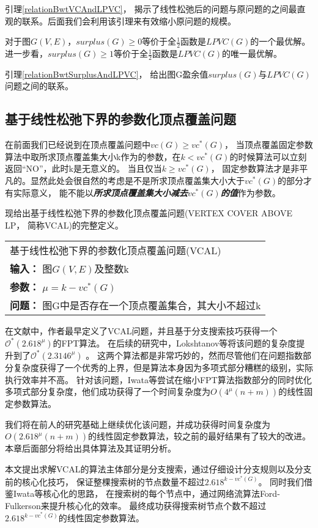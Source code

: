 引理\ref{relationBwtVCAndLPVC}， 揭示了线性松弛后的问题与原问题的之间最直观的联系。后面我们会利用该引理来有效缩小原问题的规模。

\begin{lemma}\label{relationBwtSurplusAndLPVC}
对于图$G(V, E)$，$surplus(G) \ge 0$等价于全$\frac{1}{2}$函数是$LPVC(G)$的一个最优解。
进一步看，$surplus(G) \ge 1$等价于全$\frac{1}{2}$函数是$LPVC(G)$的唯一最优解。
\end{lemma}

引理\ref{relationBwtSurplusAndLPVC}， 给出图G盈余值$surplus(G)$与$LPVC(G)$问题之间的联系。


\subsection{基于线性松弛下界的参数化顶点覆盖问题}
在前面我们已经说到在顶点覆盖问题中$vc(G)\ge vc^*(G)$，
当顶点覆盖固定参数算法中取所求顶点覆盖集大小k作为的参数，在$k < vc^*(G)$的时候算法可以立刻返回“NO”，此时k是无意义的。
当且仅当$k \ge vc^*(G)$， 固定参数算法才是非平凡的。显然此处会很自然的考虑是不是所求顶点覆盖集大小大于$vc^*(G)$的部分才有实际意义，
能不能以\textbf{\emph{所求顶点覆盖集大小减去$vc^*(G)$的值}}作为参数。

现给出基于线性松弛下界的参数化顶点覆盖问题(VERTEX COVER ABOVE LP， 简称VCAL)的完整定义。\\

\begin{tabular}{| p{0.9\headwidth} |}
  \hline
  基于线性松弛下界的参数化顶点覆盖问题(VCAL) \\
  \textbf{输入：} 图$G(V, E)$及整数k \\
  \textbf{参数：} $\mu = k - vc^*(G)$\\
  \textbf{问题：} 图G中是否存在一个顶点覆盖集合，其大小不超过k\\
  \hline
\end{tabular} \vspace{0.5cm}


在文献\cite{narayanaswamy2012lp}中，作者最早定义了VCAL问题，并且基于分支搜索技巧获得一个$\mathcal{O}^*(2.618^{\mu})$的FPT算法。
在后续的研究中，Lokshtanov等将该问题的复杂度提升到了$\mathcal{O}^*(2.3146^{\mu})$ 。
这两个算法都是非常巧妙的，然而尽管他们在问题指数部分复杂度获得了一个优秀的上界，但是算法本身因为多项式部分糟糕的级别，实际执行效率并不高。
针对该问题，Iwata等尝试在缩小FPT算法指数部分的同时优化多项式部分复杂度，他们成功获得了一个时间复杂度为$O(4^{\mu}(n+m))$的线性固定参数算法。

我们将在前人的研究基础上继续优化该问题，并成功获得时间复杂度为$O(2.618^{\mu}(n+m))$的线性固定参数算法，较之前的最好结果有了较大的改进。
本章后面部分将给出具体算法及其证明分析。

本文提出求解VCAL的算法主体部分是分支搜索，通过仔细设计分支规则以及分支前的核心化技巧，
保证整棵搜索树的节点数量不超过$2.618^{k-vc^*(G)}$。
同时我们借鉴Iwata等核心化的思路，
在搜索树的每个节点中，通过网络流算法Ford-Fulkerson来提升核心化的效率。
最终成功获得搜索树节点个数不超过$2.618^{k-vc^*(G)}$的线性固定参数算法。
